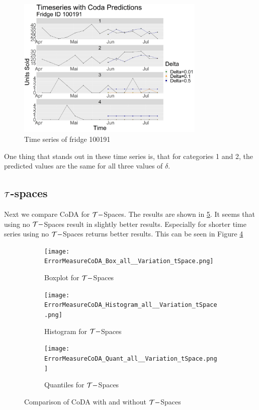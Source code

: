 \begin{figure}[htbp]
	\centering
		\includegraphics[width=0.80\textwidth]{Graphiken/Coda_Timeseries_VariationdL100191.png}
	\caption{Time series of fridge 100191}
	\label{fig:Coda_Timeseries_ID100191}
\end{figure}

One thing that stands out in these time series is, that for categories 1 and 2, the predicted values are the same for all three values of $\delta$. 

\subsection{$\mathcal{T}$-spaces}
\label{sec: Tspaces results}

Next we compare CoDA for $\mathcal{T}-$Spaces. The results are shown in \ref{fig:Coda T-Spaces Comp1}. It seems that using no $\mathcal{T}-$Spaces result in slightly better results. Especially for shorter time series using no $\mathcal{T}-$Spaces returns better results. This can be seen in Figure \ref{fig:Coda T-Spaces Quant}

\begin{figure}[htb!]
\centering
\begin{subfigure}[b]{0.45\textwidth}
\texttt{[image: ErrorMeasureCoDA\_Box\_all\_\_Variation\_tSpace.png]}
\caption{Boxplot for $\mathcal{T}-$Spaces}
\label{fig:Coda T-Spaces Box}
\end{subfigure}
\hfill
\begin{subfigure}[b]{0.45\textwidth}
\texttt{[image: ErrorMeasureCoDA\_Histogram\_all\_\_Variation\_tSpace.png]}
\caption{Histogram for $\mathcal{T}-$Spaces}
\label{fig:Coda T-Spaces Hist}
\end{subfigure}
\hfill
\begin{subfigure}[b]{0.8\textwidth}
\texttt{[image: ErrorMeasureCoDA\_Quant\_all\_\_Variation\_tSpace.png]}
\caption{Quantiles for $\mathcal{T}-$Spaces}
\label{fig:Coda T-Spaces Quant}
\end{subfigure}
\caption{Comparison of CoDA with and without $\mathcal{T}-$Spaces}
\label{fig:Coda T-Spaces Comp1}
\end{figure}

